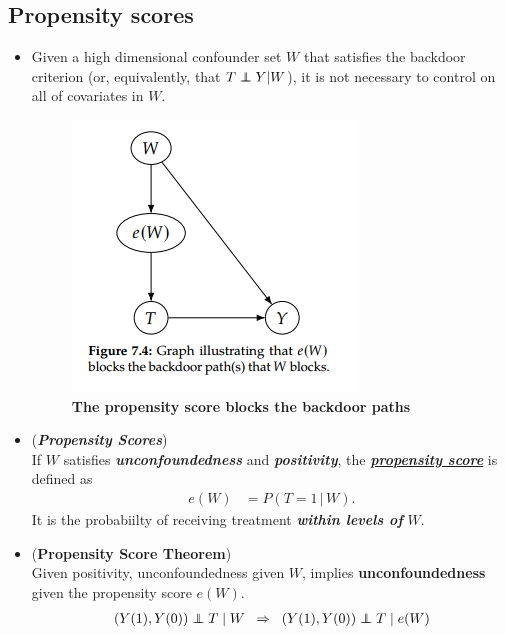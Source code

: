 \documentclass[11pt]{article}
\begin{document}
\subsection{Propensity scores}
\begin{itemize}
\item Given a high dimensional confounder set $W$ that satisfies the backdoor criterion (or, equivalently, that $T \indep Y | W$),  it is not necessary to control on all of covariates in $W$. 

\begin{figure}
\begin{minipage}[t]{1\linewidth}
  \centering
  \centerline{\includegraphics[scale = 0.6]{propensity_score.png}}
\end{minipage}
\caption{\footnotesize{\textbf{The propensity score blocks the backdoor paths  \citep{neal2020introduction}}}}
\label{fig: propensity_score}
\end{figure}


\item 
\begin{definition} (\emph{\textbf{Propensity Scores}}) \citep{rosenbaum2017observation, neal2020introduction}\\
If $W$ satisfies \emph{\textbf{unconfoundedness}} and \emph{\textbf{positivity}}, the \underline{\emph{\textbf{propensity score}}} is defined as
\begin{align}
e(W) &= P(T=1 \,|\, W). \label{eqn: propensity_score}
\end{align} It is the probabiilty of receiving treatment  \emph{\textbf{within levels of}} $W$.
\end{definition}

\item 
\begin{theorem} (\textbf{Propensity Score Theorem}) \citep{neal2020introduction}\\
Given positivity, unconfoundedness given $W$, implies \textbf{unconfoundedness} given the propensity score $e(W)$.
\begin{align}
(Y(1), Y(0)) \indep T \;|\; W \;\; \Rightarrow\;\; (Y(1), Y(0)) \indep T \;|\; e(W) \label{eqn: conditional_exchangeablity_propensity_score}
\end{align}
\end{theorem}


\end{itemize}
\end{document}
